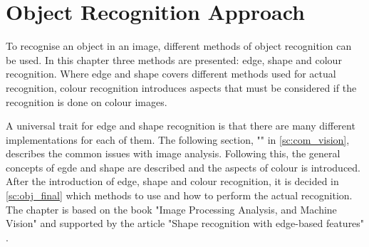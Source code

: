 \chapter{Object Recognition Approach}\label{ch:obj_rec}
To recognise an object in an image, different methods of object recognition can be used. In this chapter three methods are presented: edge, shape and colour recognition. Where edge and shape covers different methods used for actual recognition, colour recognition introduces aspects that must be considered if the recognition is done on colour images.

A universal trait for edge and shape recognition is that there are many different implementations for each of them. The following section, "" in \ref{sc:com_vision}, describes the common issues with image analysis. Following this, the general concepts of egde and shape are described and the aspects of colour is introduced.  After the introduction of edge, shape and colour recognition, it is decided in \cref{sc:obj_final} which methods to use and how to perform the actual recognition. The chapter is based on the book "Image Processing Analysis, and Machine Vision" \cite{obj_recogn_book} and supported by the article "Shape recognition with edge-based features" \cite{shape_recogn}.





